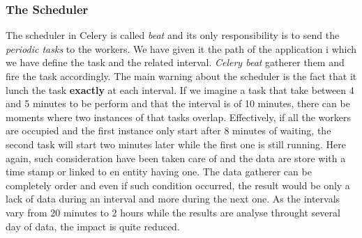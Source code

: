 \subsubsection*{The Scheduler}
The scheduler in Celery is called \emph{beat} and its only responsibility is to send the \emph{periodic tasks} to the workers. We have given it the path of the application i which we have define the task and the related interval. \emph{Celery beat} gatherer them and fire the task accordingly. The main warning about the scheduler is the fact that it lunch the task \textbf{exactly} at each interval. If we imagine a task that take between 4 and 5 minutes to be perform and that the interval is of 10 minutes, there can be moments where two instances of that tasks overlap. Effectively, if all the workers are occupied and the first instance only start after 8 minutes of waiting, the second task will start two minutes later while the first one is still running. Here again, such consideration have been taken care of and the data are store with a time stamp or linked to en entity having one. The data gatherer can be completely order and even if such condition occurred, the result would be only a lack of data during an interval and more during the next one. As the intervals vary from 20 minutes to 2 hours while the results are analyse throught several day of data, the impact is quite reduced. 


